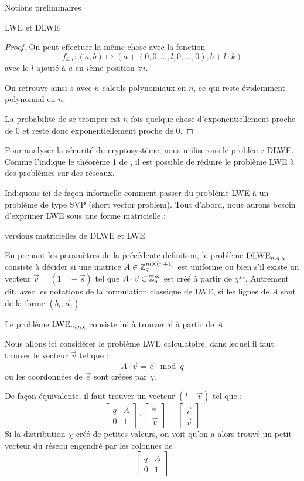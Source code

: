 \begin{section}{Notions préliminaires}
\begin{subsection}{LWE et DLWE}
\begin{proof}
	On peut effectuer la même chose avec la fonction
	\[f_{k,i}: (a,b) \mapsto (a + (0, 0, ..., l, 0, ..., 0), b + l \cdot k) \]
	avec le $l$ ajouté à $a$ en $i$ème position $\forall i$.
	
	On retrouve ainsi $s$ avec $n$ calculs polynomiaux en $n$, ce qui reste évidemment polynomial en $n$.
	
	La probabilité de se tromper est $n$ fois quelque chose d'exponentiellement proche de 0 et reste donc
	exponentiellement proche de 0.
	\end{proof}

	Pour analyser la sécurité du cryptosystème, nous utiliserons le problème DLWE. Comme l'indique le théorème 1 de
	\cite{C:GenSahWat13}, il est possible de réduire le problème LWE à des problèmes sur des réseaux.

	Indiquons ici de façon informelle comment passer du problème LWE à un problème de type SVP (short vector
	problem). Tout d'abord, nous aurons besoin d'exprimer LWE sous une forme matricielle :

	\begin{definition}{versions matricielles de DLWE et LWE}

	En prenant les paramètres de la précédente définition, le problème $\text{DLWE}_{n,q,\chi}$ consiste à décider si une matrice $A \in \mathbb{Z}_q^{m \times (n+1)}$ est uniforme ou bien s'il existe un vecteur $\vec{v} = (1\quad -\vec{s})$ tel que $A \cdot \vec{v} \in \mathbb{Z}_q^{m}$ est créé à partir de $\chi^m$. Autrement dit, avec les notations de la formulation classique de LWE, si les lignes de $A$ sont de la forme $(b_i, \vec{a}_i)$.
	
	Le problème $\text{LWE}_{n,q,\chi}$ consiste lui à trouver $\vec{v}$ à partir de $A$.
	\end{definition}

	Nous allons ici considérer le problème LWE calculatoire, dans lequel il faut trouver le vecteur $\vec{v}$ tel que :
	\[ A\cdot \vec{v} = \vec{e} \mod q \]
	où les coordonnées de $\vec{e}$ sont créées par $\chi$.

	De façon équivalente, il faut trouver un vecteur $(*\quad\vec{v})$ tel que :
	\[ \begin{bmatrix}q & A \\ 0 &1 \end{bmatrix}\cdot
	   \begin{bmatrix}* \\ \vec{v} \end{bmatrix} =
	   \begin{bmatrix} \vec{e} \\ \vec{v} \end{bmatrix} \]
	Si la distribution $\chi$ créé de petites valeurs, on voit qu'on a alors trouvé un \og petit \fg vecteur du réseau engendré par les colonnes de 
	\[ \begin{bmatrix}q & A \\ 0 &1 \end{bmatrix} \]


\end{subsection}
\end{section}
